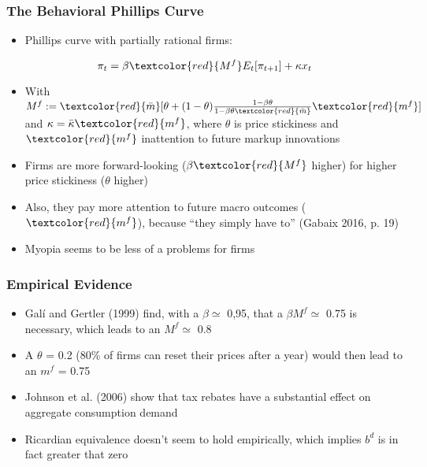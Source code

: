 \documentclass{beamer}
\begin{document}

\begin{frame}
\frametitle{The Behavioral Phillips Curve}
\begin{itemize}
\item Phillips curve with partially rational firms:
\end{itemize}
	$$\pi_{t}=\beta \textcolor{red}{M^{f}}E_{t}[\pi_{t+1}]+\kappa x_{t}$$
\begin{itemize}
\item With $M^{f}:=\textcolor{red}{\bar m}[\theta+(1-\theta)\frac{1-\beta \theta}{1-\beta \theta \textcolor{red}{\bar m}}\textcolor{red}{m^{f}}]$ and $\kappa=\bar \kappa \textcolor{red}{m^{f}}$, where $\theta$ is price stickiness and $\textcolor{red}{m^{f}}$ inattention to future markup innovations
\item Firms are more forward-looking ($\beta \textcolor{red}{ M^{f}}$ higher) for higher price stickiness ($\theta$ higher) 
\item Also, they pay more attention to future macro outcomes ($\textcolor{red}{m^{f}}$),  because ``they simply have to'' (Gabaix 2016, p. 19)
\item Myopia seems to be less of a problems for firms
\end{itemize}
\end{frame}


\begin{frame}
\frametitle{Empirical Evidence}
\begin{itemize}
\item Gal\'{i} and Gertler (1999) find, with a $\beta \simeq$ 0,95, that a $\beta M^{f}\simeq$ 0.75 is necessary, which leads to an $M^{f}\simeq$ 0.8
\item A $\theta$ = 0.2 (80\% of firms can reset their prices after a year) would then lead to an ${m^{f}}$ = 0.75
\item Johnson et al. (2006) show that tax rebates have a substantial effect on aggregate consumption demand
\item Ricardian equivalence doesn't seem to hold empirically, which implies $b^{d}$ is in fact greater that zero  
\end{itemize}
\end{frame}

\end{document}
